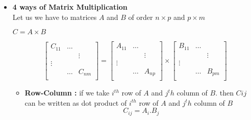 \documentclass[a4paper,11pt]{article}
\numberwithin{equation}{section}
\begin{document}
    \begin{itemize}
        \item \textbf{ 4 ways of Matrix Multiplication }\\

    Let us we have to matrices $A$ and $B$ of order $n \times p$ and $p \times m$
    \begin{center}
        $C=A \times B$
    \end{center}
    \begin{equation}
        \begin{bmatrix}
            C_{11}  & \dots & \\
             & &\vdots \\
            \vdots  & & \\
            & \dots & C_{nm}\\
        \end{bmatrix}=
        \begin{bmatrix}
            A_{11}  & \dots & \\
             & &\vdots \\
            \vdots  & & \\
            & \dots & A_{np}\\
        \end{bmatrix} \times
        \begin{bmatrix}
            B_{11}  & \dots & \\
             & &\vdots \\
            \vdots  & & \\
            & \dots & B_{pm}\\
        \end{bmatrix}
    \end{equation}

        \begin{itemize}
            \item \textbf{Row-Column : }if we take $i^{th}$ row of $A$ and $j^th $ column of $B$. then $C{ij}$ can be written as dot product of $i^{th}$ row of $A$ and $j^th $ column of $B$\\
            
            \begin{equation}
                C_{ij}=A_i.B_j
            \end{equation}


\end{itemize}
\end{itemize}
\end{document}
